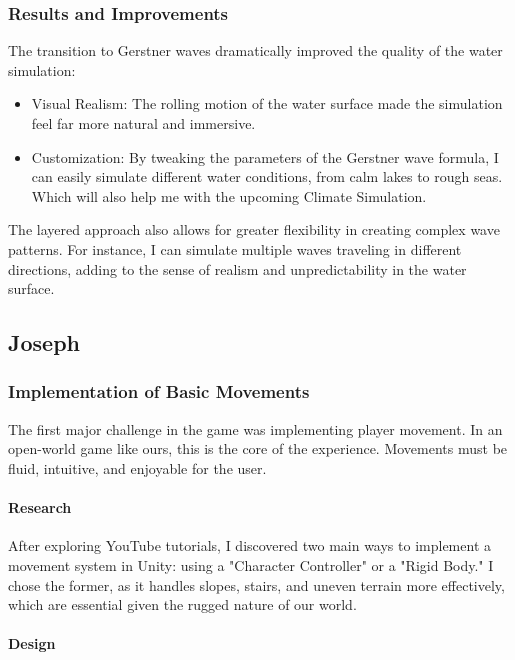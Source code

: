 \documentclass{article}
\begin{document}
\subsubsection{Results and Improvements}\hfill

The transition to Gerstner waves dramatically improved the quality of the water simulation:
\begin{itemize}
    \item Visual Realism: The rolling motion of the water surface made the simulation feel far more natural and immersive.
    \item Customization: By tweaking the parameters of the Gerstner wave formula, I can easily simulate different water conditions, from calm lakes to rough seas. Which will also help me with the upcoming Climate Simulation.
\end{itemize}

The layered approach also allows for greater flexibility in creating complex wave patterns. For instance, I can simulate multiple waves traveling in different directions, adding to the sense of realism and unpredictability in the water surface.





\newpage
\subsection{Joseph}
\subsubsection{Implementation of Basic Movements}\hfill

The first major challenge in the game was implementing player movement. In an open-world game like ours, this is the core of the experience. Movements must be fluid, intuitive, and enjoyable for the user.

\paragraph{Research}\hfill

After exploring YouTube tutorials, I discovered two main ways to implement a movement system in Unity: using a "Character Controller" or a "Rigid Body." I chose the former, as it handles slopes, stairs, and uneven terrain more effectively, which are essential given the rugged nature of our world.

\paragraph{Design}\hfill
\end{document}
